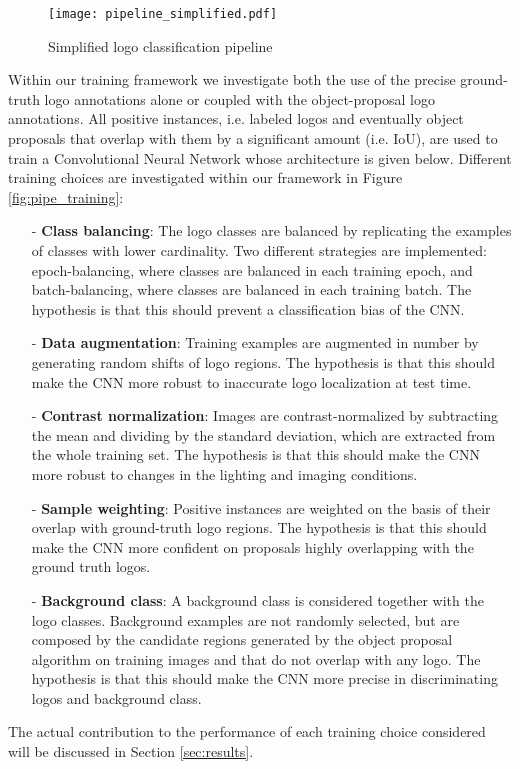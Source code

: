 \documentclass[final,5p,twocolumn]{elsarticle}
\begin{document}
\begin{figure*}[htbp]
	\texttt{[image: pipeline\_simplified.pdf]}
	\centering
	\caption{Simplified logo classification pipeline}
	\label{fig:pipeline_simplified}
\end{figure*}



Within our training framework we investigate both the use of the precise ground-truth logo annotations alone or coupled with the object-proposal logo annotations.
All positive instances, i.e. labeled logos and eventually object proposals that overlap with them by a significant amount (i.e.  IoU), are used to train a Convolutional Neural Network whose architecture is given below.
Different training choices are investigated within our framework in Figure \ref{fig:pipe_training}: 

\begin{itemize}
\item[-] {\bf{Class balancing}}: The logo classes are balanced by replicating the examples of classes with lower cardinality. Two different strategies are implemented: epoch-balancing, where classes are balanced in each training epoch, and batch-balancing, where classes are balanced in each training batch. The hypothesis is that this should prevent a classification bias of the CNN.
\item[-] {\bf{Data augmentation}}: Training examples are augmented in number by generating random shifts of logo regions. The hypothesis is that this should make the CNN more robust to inaccurate logo localization at test time.
\item[-] {\bf{Contrast normalization}}: Images are contrast-normalized by subtracting the mean and dividing by the standard deviation, which are extracted from the whole training set. The hypothesis is that this should make the CNN more robust to changes in the lighting and imaging conditions.
\item[-] {\bf{Sample weighting}}: Positive instances are weighted on the basis of their overlap with ground-truth logo regions. The hypothesis is that this should make the CNN more confident on proposals highly overlapping with the ground truth logos.
\item[-] {\bf{Background class}}: A background class is considered together with the logo classes.
Background examples are not randomly selected, but are composed by the candidate regions generated by the object proposal algorithm on training images and that do not overlap with any logo. The hypothesis is that this should make the CNN more precise in discriminating logos and background class. \end{itemize}
The actual contribution to the performance of each training choice considered will be discussed in Section \ref{sec:results}.
\end{document}
